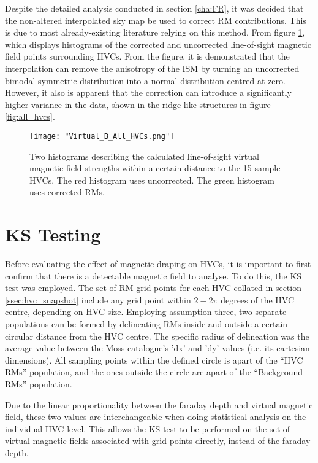 Despite the detailed analysis conducted in section \ref{cha:FR}, it was decided that the non-altered interpolated sky map be used to correct RM contributions. This is due to most already-existing literature relying on this method. From figure \ref{fig:anisotropy}, which displays histograms of the corrected and uncorrected line-of-sight magnetic field points surrounding HVCs. From the figure, it is demonstrated that the interpolation can remove the anisotropy of the ISM by turning an uncorrected bimodal symmetric distribution into a normal distribution centred at zero. However, it also is apparent that the correction can introduce a significantly higher variance in the data, shown in the ridge-like structures in figure \ref{fig:all_hvcs}.

\begin{figure}
    \texttt{[image: "Virtual\_B\_All\_HVCs.png"]}
    \centering
    \caption{Two histograms describing the calculated line-of-sight virtual magnetic field strengths within a certain distance to the 15 sample HVCs. The red histogram uses uncorrected. The green histogram uses corrected RMs.}
    \label{fig:anisotropy}
\end{figure}


\section{KS Testing}
\label{sec:KStest}

Before evaluating the effect of magnetic draping on HVCs, it is important to first confirm that there is a detectable magnetic field to analyse. To do this, the KS test was employed. The set of RM grid points for each HVC collated in section \ref{ssec:hvc_snapshot} include any grid point within $2 - 2\pi$ degrees of the HVC centre, depending on HVC size. Employing assumption three, two separate populations can be formed by delineating RMs inside and outside a certain circular distance from the HVC centre. The specific radius of delineation was the average value between the Moss catalogue's 'dx' and 'dy' values (i.e. its cartesian dimensions). All sampling points within the defined circle is apart of the “HVC RMs” population, and the ones outside the circle are apart of the “Background RMs” population.


Due to the linear proportionality between the faraday depth and virtual magnetic field, these two values are interchangeable when doing statistical analysis on the individual HVC level. This allows the KS test to be performed on the set of virtual magnetic fields associated with grid points directly, instead of the faraday depth.


